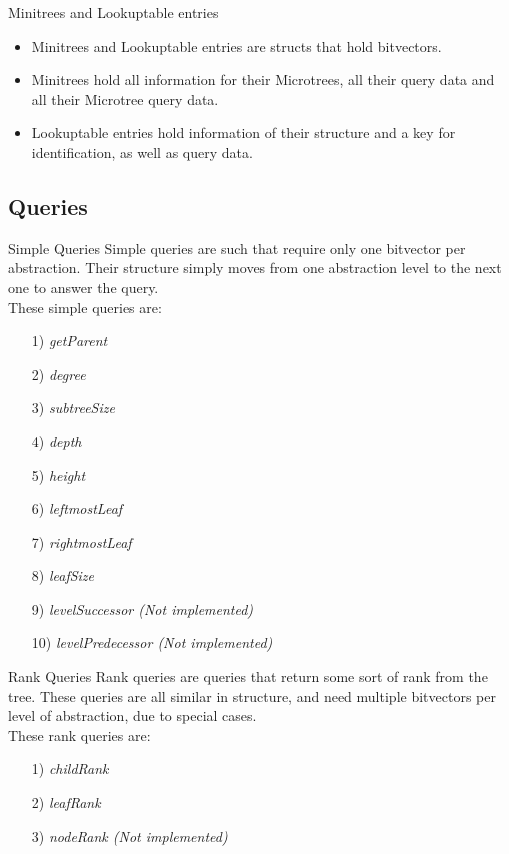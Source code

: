 \documentclass{beamer}
\begin{document}
\begin{frame}{Minitrees and Lookuptable entries}
	\begin{itemize}
	\item
		Minitrees and Lookuptable entries are structs that hold bitvectors.
	\item
		Minitrees hold all information for their Microtrees, all their query data and all their Microtree query data.
	\item
		Lookuptable entries hold information of their structure and a key for identification, as well as query data.
	\end{itemize}
\end{frame}



\subsection{Queries}

\begin{frame}{Simple Queries}
	Simple queries are such that require only one bitvector per abstraction. Their structure simply moves from one abstraction level to the next one to answer the query.\\
	These simple queries are:
	\begin{itemize}
	\item[1)] \textit{getParent}
	\item[2)] \textit{degree}
	\item[3)] \textit{subtreeSize}
	\item[4)] \textit{depth}
	\item[5)] \textit{height}
	\item[6)] \textit{leftmostLeaf}
	\item[7)] \textit{rightmostLeaf}
	\item[8)] \textit{leafSize}
	\item[9)] \textit{levelSuccessor (Not implemented)}
	\item[10)] \textit{levelPredecessor (Not implemented)}
	\end{itemize}
\end{frame}

\begin{frame}{Rank Queries}
	Rank queries are queries that return some sort of rank from the tree. These queries are all similar in structure, and need multiple bitvectors per level of abstraction, due to special cases.\\
	These rank queries are:
	\begin{itemize}
	\item[1)] \textit{childRank}
	\item[2)] \textit{leafRank}
	\item[3)] \textit{nodeRank (Not implemented)}
	\end{itemize}
\end{frame}
\end{document}
